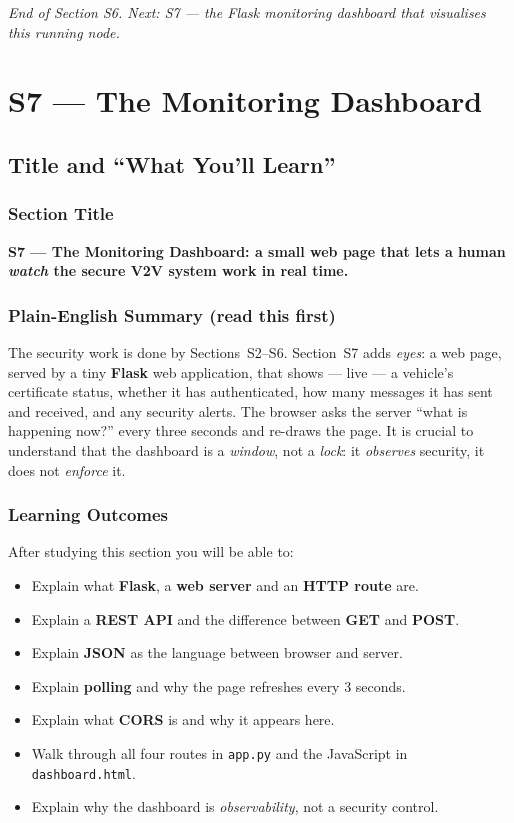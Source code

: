 \documentclass[11pt,a4paper]{report}
\begin{document}
\vfill
\begin{center}\footnotesize\itshape
End of Section S6. Next: S7 --- the Flask monitoring dashboard that visualises
this running node.
\end{center}



\chapter{S7 --- The Monitoring Dashboard}

\section{Title and ``What You'll Learn''}

\subsection*{Section Title}
\textbf{S7 --- The Monitoring Dashboard: a small web page that lets a human
\emph{watch} the secure V2V system work in real time.}

\subsection*{Plain-English Summary (read this first)}
The security work is done by Sections~S2--S6. Section~S7 adds \emph{eyes}: a web
page, served by a tiny \textbf{Flask} web application, that shows --- live --- a
vehicle's certificate status, whether it has authenticated, how many messages it
has sent and received, and any security alerts. The browser asks the server
``what is happening now?'' every three seconds and re-draws the page. It is
crucial to understand that the dashboard is a \emph{window}, not a \emph{lock}:
it \emph{observes} security, it does not \emph{enforce} it.

\subsection*{Learning Outcomes}
After studying this section you will be able to:
\begin{itemize}
  \item Explain what \textbf{Flask}, a \textbf{web server} and an
        \textbf{HTTP route} are.
  \item Explain a \textbf{REST API} and the difference between \textbf{GET} and
        \textbf{POST}.
  \item Explain \textbf{JSON} as the language between browser and server.
  \item Explain \textbf{polling} and why the page refreshes every 3 seconds.
  \item Explain what \textbf{CORS} is and why it appears here.
  \item Walk through all four routes in \texttt{app.py} and the JavaScript in
        \texttt{dashboard.html}.
  \item Explain why the dashboard is \emph{observability}, not a security control.
\end{itemize}
\end{document}
